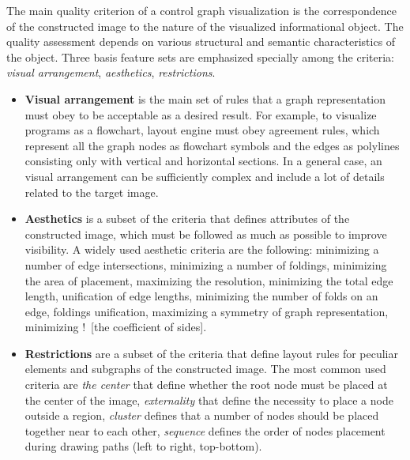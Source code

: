 \documentclass[conference]{IEEEtran}
\newcommand{\nnn}[2][ncolor]{\noindent%
\textcolor{eclr}{!\ [}\textcolor{#1}{#2}\textcolor{eclr}{]}}
\begin{document}
The main quality criterion of a control graph visualization is the correspondence of the constructed image to the nature of the visualized informational object.  The quality assessment depends on various structural and semantic characteristics of the object.  Three basis feature sets are emphasized specially among the criteria: \emph{visual arrangement}, \emph{aesthetics}, \emph{restrictions}.
\begin{itemize}
\item \textbf{Visual arrangement} is the main set of rules that a graph representation must obey to be acceptable as a desired result.  For example, to visualize programs as a flowchart, layout engine must obey agreement rules, which represent all the graph nodes as flowchart symbols and the edges as polylines consisting only with vertical and horizontal sections.  In a general case, an visual arrangement can be sufficiently complex and include a lot of details related to the target image.
\item \textbf{Aesthetics} is a subset of the criteria that defines attributes of the constructed image, which must be followed as much as possible to improve visibility.  A widely used aesthetic criteria are the following: minimizing a number of edge intersections, minimizing a number of foldings, minimizing the area of placement, maximizing the resolution, minimizing the total edge length, unification of edge lengths, minimizing the number of folds on an edge, foldings unification, maximizing a symmetry of graph representation, minimizing \nnn{the coefficient of sides}. %
\item \textbf{Restrictions} are a subset of the criteria that define layout rules for peculiar elements and subgraphs of the constructed image.  The most common used criteria are \emph{the center} that define whether the root node must be placed at the center of the image, \emph{externality} that define the necessity to place a node outside a region, \emph{cluster} defines that a number of nodes should be placed together near to each other, \emph{sequence} defines the order of nodes placement during drawing paths (left to right, top-bottom).
\end{itemize}
\end{document}
